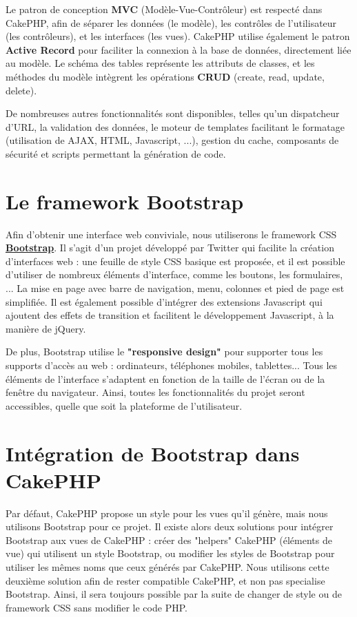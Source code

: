 \documentclass[10pt]{article}
\begin{document}
Le patron de conception \textbf{MVC} (Modèle-Vue-Contrôleur) est respecté dans CakePHP, afin de séparer les données (le modèle), les contrôles de l'utilisateur (les contrôleurs), et les interfaces (les vues). CakePHP utilise également le patron \textbf{Active Record} pour faciliter la connexion à la base de données, directement liée au modèle. Le schéma des tables représente les attributs de classes, et les méthodes du modèle intègrent les opérations \textbf{CRUD} (create, read, update, delete).


De nombreuses autres fonctionnalités sont disponibles, telles qu'un dispatcheur d'URL, la validation des données, le moteur de templates facilitant le formatage (utilisation de AJAX, HTML, Javascript, ...), gestion du cache, composants de sécurité et scripts permettant la génération de code.

\newpage
\section{Le framework Bootstrap}

Afin d'obtenir une interface web conviviale, nous utiliserons le framework CSS \href{http://twitter.github.com/bootstrap/}{\textbf{Bootstrap}}. Il s'agit d'un projet développé par Twitter qui facilite la création d'interfaces web : une feuille de style CSS basique est proposée, et il est possible d'utiliser de nombreux éléments d'interface, comme les boutons, les formulaires, ... La mise en page avec barre de navigation, menu, colonnes et pied de page est simplifiée. Il est également possible d'intégrer des extensions Javascript qui ajoutent des effets de transition et facilitent le développement Javascript, à la manière de jQuery.


De plus, Bootstrap utilise le \textbf{"responsive design"} pour supporter tous les supports d'accès au web : ordinateurs, téléphones mobiles, tablettes... Tous les éléments de l'interface s'adaptent en fonction de la taille de l'écran ou de la fenêtre du navigateur. Ainsi, toutes les fonctionnalités du projet seront accessibles, quelle que soit la plateforme de l'utilisateur.


\section{Intégration de Bootstrap dans CakePHP}

Par défaut, CakePHP propose un style pour les vues qu'il génère, mais nous utilisons Bootstrap pour ce projet.
Il existe alors deux solutions pour intégrer Bootstrap aux vues de CakePHP : créer des "helpers" CakePHP (éléments de vue) qui utilisent un style Bootstrap, ou modifier les styles de Bootstrap pour utiliser les mêmes noms que ceux générés par CakePHP.
Nous utilisons cette deuxième solution afin de rester compatible CakePHP, et non pas specialise Bootstrap. Ainsi, il sera toujours possible par la suite de changer de style ou de framework CSS sans modifier le code PHP.
\end{document}

